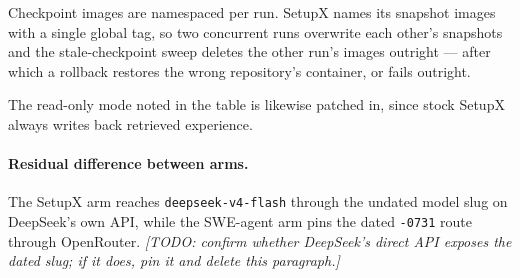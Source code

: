 Checkpoint images are namespaced per run. SetupX names its snapshot images with
a single global tag, so two concurrent runs overwrite each other's snapshots and
the stale-checkpoint sweep deletes the other run's images outright --- after
which a rollback restores the wrong repository's container, or fails outright.

The read-only mode noted in the table is likewise patched in, since stock SetupX
always writes back retrieved experience.

\paragraph{Residual difference between arms.}
The SetupX arm reaches \texttt{deepseek-v4-flash} through the undated model
slug on DeepSeek's own API, while the SWE-agent arm pins the dated
\texttt{-0731} route through OpenRouter. \emph{[TODO: confirm whether DeepSeek's
direct API exposes the dated slug; if it does, pin it and delete this
paragraph.]}
